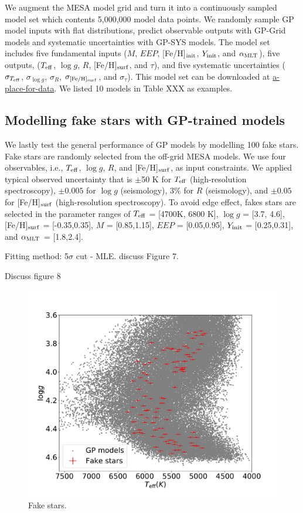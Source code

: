 We augment the MESA model grid and turn it into a continuously sampled model set which contents 5,000,000 model data points. We randomly sample GP model inputs with flat distributions, predict observable outputs with GP-Grid models and systematic uncertainties with GP-SYS models. The model set includes five fundamental inputs ($M$, $EEP$, [Fe/H]$_{\rm init}$, $Y_{\rm init}$, and $\alpha_{\rm MLT}$), five outputs, ($T_{\rm eff}$, $\log g$,  $R$,  [Fe/H]$_{\rm surf}$, and  $\tau$), and five systematic uncertainties ($\sigma_{T_{\rm eff}}$, $\sigma_{\log g}$,  $\sigma_{R}$,  $\sigma_{\rm [Fe/H]_{\rm surf}}$, and $\sigma_{\tau}$). This model set can be downloaded at \url{a-place-for-data}. We listed 10 models in Table XXX as examples. 

\subsection{Modelling fake stars with GP-trained models}

We lastly test the general performance of GP models by modelling 100 fake stars. Fake stars are randomly selected from the off-grid MESA models. We use four observables, i.e., $T_{\rm eff}$, $\log g$, $R$, and [Fe/H]$_{\rm surf}$, as input constraints. We applied typical observed uncertainty that is $\pm$50 K for $T_{\rm eff}$ (high-resolution spectroscopy), $\pm0.005$ for $\log g$ (seismology), $3\%$ for $R$ (seismology), and $\pm0.05$ for [Fe/H]$_{\rm surf}$ (high-resolution spectroscopy). 
%
To avoid edge effect, fakes stars are selected in the parameter ranges of 
$T_{\rm eff}$ = [4700K, 6800 K], $\log g$ = [3.7, 4.6], [Fe/H]$_{\rm surf}$ = [-0.35,0.35], $M$ = [0.85,1.15], $EEP$ = [0.05,0.95], $Y_{\rm init}$ = [0.25,0.31], and $\alpha_{\rm MLT}$ = [1.8,2.4]. 

Fitting method: 5$\sigma$ cut - MLE. discuss Figure 7. 

Discuss figure 8

\begin{figure}
	\includegraphics[width=1.0\columnwidth]{fake-stars-on-hrd.pdf}
    \caption{Fake stars. } 
  \label{fig:fit_comparison}
\end{figure}

